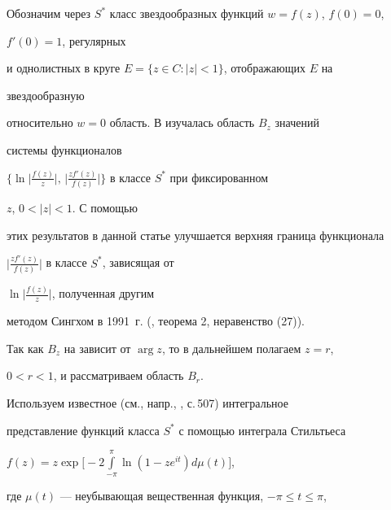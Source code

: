  


 




 


\maketitle 


\label{begin} 


 


Обозначим через $S^*$ класс звездообразных функций $w=f(z)$, $f(0)=0$, 


$f'(0)=1$, регулярных 


и однолистных в круге $E=\{z\in C:|z|<1\}$, отображающих $E$ на 


звездообразную 


относительно $w=0$ область. В \cite{1} изучалась область $B_z$ значений 


системы функционалов 


$\Big\{\ln\Big|\frac{f(z)}{z}\Big|,\, 


\Big|\frac{z f'(z)}{f(z)}\Big|\Big\}$ в классе $S^*$ при фиксированном 


$z$, $0<|z|<1$. С помощью 


этих результатов в данной статье улучшается верхняя граница функционала 


$\Big|\frac{z f'(z)}{f(z)}\Big|$ в классе $S^*$, зависящая от 


$\ln\Big|\frac{f(z)}{z}\Big|$, полученная другим 


методом Сингхом в 1991~г. (\cite{2}, теорема 2, неравенство (27)). 


 


Так как $B_z$ на зависит от $\arg z$, то в дальнейшем полагаем $z=r$, 


$0<r<1$, и рассматриваем область $B_r$. 


 


Используем известное (см., напр., \cite{3}, с.\,507) интегральное 


представление функций класса $S^*$ с помощью интеграла Стильтьеса 


$f(z)=z\exp\Big[-2\int\limits^\pi_{-\pi}\ln(1-z e^{it})d\mu(t)\Big]$, 


где $\mu(t)$ --- неубывающая вещественная функция, $-\pi\le t\le\pi$, 


